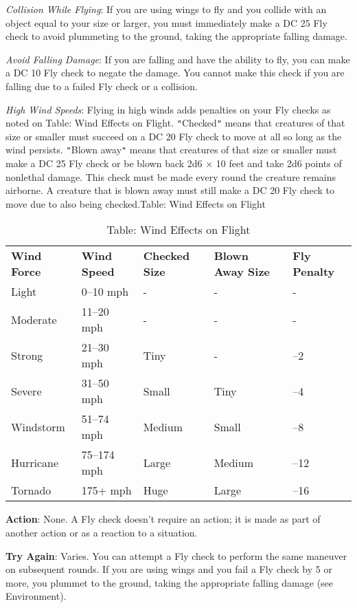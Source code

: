 \textit{Collision While Flying}: If you are using wings to fly and you collide with an object equal to your size or larger, you must immediately make a DC 25 Fly check to avoid plummeting to the ground, taking the appropriate falling damage.
				
\textit{Avoid Falling Damage}: If you are falling and have the ability to fly, you can make a DC 10 Fly check to negate the damage. You cannot make this check if you are falling due to a failed Fly check or a collision.
				
\textit{High Wind Speeds}: Flying in high winds adds penalties on your Fly checks as noted on Table: Wind Effects on Flight. \texttt{{}"{}}Checked\texttt{{}"{}} means that creatures of that size or smaller must succeed on a DC 20 Fly check to move at all so long as the wind persists. \texttt{{}"{}}Blown away\texttt{{}"{}} means that creatures of that size or smaller must make a DC 25 Fly check or be blown back 2d6 \mbox{$\times$} 10 feet and take 2d6 points of nonlethal damage. This check must be made every round the creature remains airborne. A creature that is blown away must still make a DC 20 Fly check to move due to also being checked.Table: Wind Effects on Flight

\begin{table*}[]
\sffamily
\caption{Table: Wind Effects on Flight}
\begin{tabular}{lllll}
\textbf{Wind Force} & \textbf{Wind Speed} & \textbf{Checked Size} & \textbf{Blown Away Size} & \textbf{Fly Penalty}\\
Light& 0--10 mph& -& -& - \\
Moderate& 11--20 mph& -& -& - \\
Strong& 21--30 mph& Tiny& -& --2 \\
Severe& 31--50 mph& Small& Tiny& --4 \\
Windstorm& 51--74 mph& Medium& Small& --8 \\
Hurricane& 75--174 mph& Large& Medium& --12 \\
Tornado& 175+ mph& Huge& Large& --16\\
\end{tabular}
\end{table*}

				
\textbf{Action}: None. A Fly check doesn't require an action; it is made as part of another action or as a reaction to a situation.
				
\textbf{Try Again}: Varies. You can attempt a Fly check to perform the same maneuver on subsequent rounds. If you are using wings and you fail a Fly check by 5 or more, you plummet to the ground, taking the appropriate falling damage (see Environment).
				
